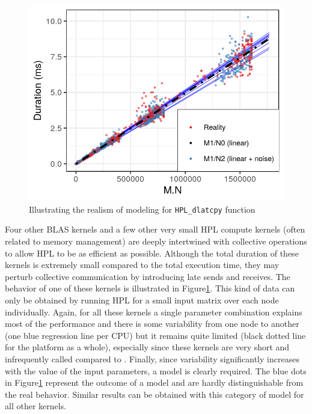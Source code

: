             \begin{figure}[ht]
                \centering
                \includegraphics[height=.25\textheight]{img/prediction/modeling/kernels/dlatcpy_model.png}
                \caption{Illustrating the realism of modeling for \texttt{HPL\_dlatcpy} function}
                \label{fig:HPL_var}
            \end{figure}

            Four other BLAS kernels and a few other very small HPL compute kernels (often related to memory management)
            are deeply intertwined with collective operations to allow HPL to be as efficient as possible. Although the
            total duration of these kernels is extremely small compared to the total execution time, they may perturb
            collective communication by introducing late sends and receives. The behavior of one of these kernels is
            illustrated in Figure\ref{fig:HPL_var}. This kind of data can only be obtained by running HPL for a small
            input matrix over each node individually. Again, for all these kernels a single parameter combination
            explains most of the performance and there is some variability from one node to another (one blue regression
            line per CPU) but it remains quite limited (black dotted line for the platform as a whole), especially since
            these kernels are very short and infrequently called compared to \dgemm. Finally, since variability
            significantly increases with the value of the input parameters, a  model is clearly required. The
            blue dots in Figure\ref{fig:HPL_var} represent the outcome of a  model and are hardly
            distinguishable from the real behavior. Similar results can be obtained with this category of model for all
            other kernels.

